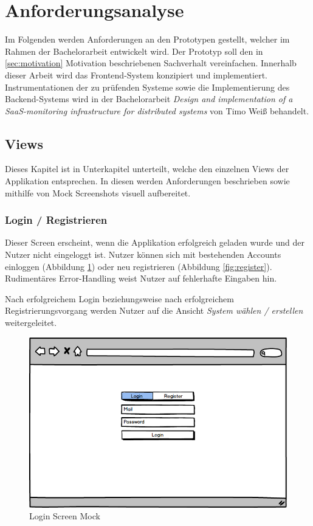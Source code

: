 \newpage

\section{Anforderungsanalyse}
\label{sec:anforderungsanalyse}
Im Folgenden werden Anforderungen an den Prototypen gestellt, welcher im Rahmen der Bachelorarbeit entwickelt wird.
Der Prototyp soll den in \ref{sec:motivation} Motivation beschriebenen Sachverhalt vereinfachen.
Innerhalb dieser Arbeit wird das Frontend-System konzipiert und implementiert.
Instrumentationen der zu prüfenden Systeme sowie die Implementierung des Backend-Systems wird in der Bachelorarbeit \emph{
Design and implementation of a SaaS-monitoring infrastructure for distributed systems} von Timo Weiß behandelt.

\subsection{Views}

Dieses Kapitel ist in Unterkapitel unterteilt, welche den einzelnen Views der Applikation \projectname{} entsprechen.
In diesen werden Anforderungen beschrieben sowie mithilfe von Mock Screenshots visuell aufbereitet.

\subsubsection{Login / Registrieren}

Dieser Screen erscheint, wenn die Applikation erfolgreich geladen wurde und der Nutzer nicht eingeloggt ist.
Nutzer können sich mit bestehenden Accounts einloggen (Abbildung \ref{fig:login}) oder neu registrieren (Abbildung \ref{fig:register}).
Rudimentäres Error-Handling weist Nutzer auf fehlerhafte Eingaben hin.

Nach erfolgreichem Login beziehungsweise nach erfolgreichem Registrierungsvorgang werden Nutzer auf die Ansicht \emph{System wählen / erstellen} weitergeleitet.

\vspace{0.3cm}

\begin{figure}[h]
 \centering
 \includegraphics[width=0.7\linewidth]{kapitel1/mocks/Login.png}
 \caption{Login Screen Mock}
  \label{fig:login}
\end{figure}

